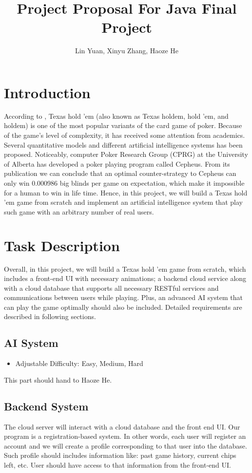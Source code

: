 \documentclass{article}
\title{Project Proposal For Java Final Project}
\author{Lin Yuan, Xinyu Zhang, Haoze He}
\begin{document}
\maketitle
\section{Introduction}
According to \cite{wikipedia_2022}, Texas hold 'em (also known as Texas holdem, hold 'em, and holdem) is one of the most popular variants of the card game of poker. Because of the game's level of complexity, it has received some attention from academics. Several quantitative models and different artificial intelligence systems has been proposed. Noticeably, computer Poker Research Group (CPRG) at the University of Alberta has developed a poker playing program called Cepheus. From its publication\cite{bowling2015heads} we can conclude that an optimal counter-strategy to Cepheus can only win 0.000986 big blinds per game on expectation, which make it impossible for a human to win in life time. Hence, in this project, we will build a Texas hold 'em game from scratch and implement an artificial intelligence system that play such game with an arbitrary number of real users. 
\section{Task Description}
Overall, in this project, we will build a Texas hold 'em game from scratch, which includes a front-end UI with necessary animations; a backend cloud service along with a cloud database that supports all necessary RESTful services and communications between users while playing. Plus, an advanced AI system that can play the game optimally should also be included. Detailed requirements are described in following sections.
\subsection{AI System}
\begin{itemize}
	\item Adjustable Difficulty: Easy, Medium, Hard
\end{itemize}
This part should hand to Haoze He.
\subsection{Backend System}
The cloud server will interact with a cloud database and the front end UI. Our program is a registration-based system. In other words, each user will register an account and we will create a profile corresponding to that user into the database. Such profile should includes information like: past game history, current chips left, etc. User should have access to that information from the front-end UI. \\
\end{document}
